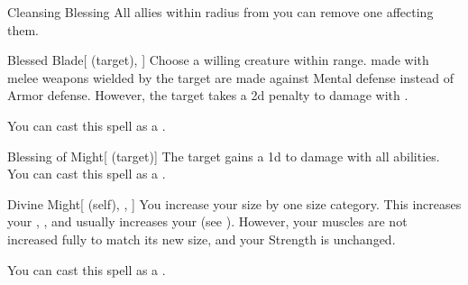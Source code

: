 \lowercase{\hypertarget{spell:Cleansing Blessing}{}}\label{spell:Cleansing Blessing}
\begin{ability}[\nth{1}]{\hypertarget{spell:Cleansing Blessing}{Cleansing Blessing}}
All allies within \arealarge radius from you can remove one  affecting them.
\end{ability}
\vspace{0.25em}



\lowercase{\hypertarget{spell:Blessed Blade}{}}\label{spell:Blessed Blade}
\begin{ability}[\nth{2}]{\hypertarget{spell:Blessed Blade}{Blessed Blade}}[ (target), ]
Choose a willing creature within \rngclose range.
 made with melee weapons wielded by the target are made against Mental defense instead of Armor defense.
However, the target takes a \minus2d penalty to damage with .

You can cast this spell as a .
\end{ability}
\vspace{0.25em}



\lowercase{\hypertarget{spell:Blessing of Might}{}}\label{spell:Blessing of Might}
\begin{ability}[\nth{2}]{\hypertarget{spell:Blessing of Might}{Blessing of Might}}[ (target)]
The target gains a \plus1d  to damage with all abilities.
You can cast this spell as a .
\end{ability}
\vspace{0.25em}



\lowercase{\hypertarget{spell:Divine Might}{}}\label{spell:Divine Might}
\begin{ability}[\nth{3}]{\hypertarget{spell:Divine Might}{Divine Might}}[ (self), , ]
You increase your size by one size category.
This increases your , , and usually increases your  (see ).
However, your muscles are not increased fully to match its new size, and your Strength is unchanged.

You can cast this spell as a .
\end{ability}
\vspace{0.25em}




